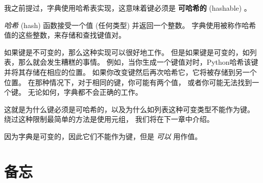 %

我之前提过，字典使用哈希表实现，这意味着键必须是 {\bf 可哈希的} (hashable) 。

  



{\em 哈希} (hash) 函数接受一个值 (任何类型) 并返回一个整数。
字典使用被称作哈希值的这些整数，来存储和查找键值对。


如果键是不可变的，那么这种实现可以很好地工作。
但是如果键是可变的，如列表，那么就会发生糟糕的事情。
例如，当你生成一个键值对时，Python哈希该键并将其存储在相应的位置。
如果你改变键然后再次哈希它，它将被存储到另一个位置。
在那种情况下，对于相同的键，你可能有两个值， 或者你可能无法找到一个键。
无论如何，字典都不会正确的工作。


这就是为什么键必须是可哈希的，以及为什么如列表这种可变类型不能作为键。
绕过这种限制最简单的方法是使用元组， 我们将在下一章中介绍。


因为字典是可变的，因此它们不能作为键，但是 {\em 可以} 用作值。


\section{备忘}
\label{memoize}

